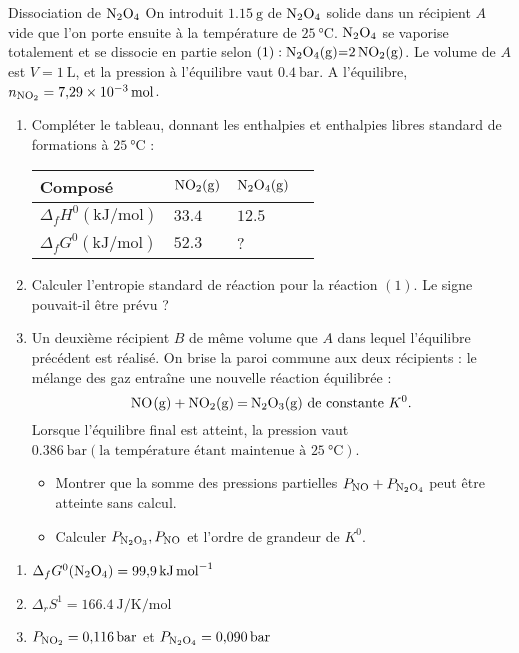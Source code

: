 \documentclass[french, a4paper, 11pt]{article}
\begin{document}
\begin{cadre}{Dissociation de \(\ce{N2O4}\)}
  On introduit \(\SI{1.15}{\gram}\) de \(\ce{N2O4}\) solide dans un récipient \(A\) vide que l'on porte ensuite à
  la température de \(\SI{25}{\celsius}\). \(\ce{N2O4}\) se vaporise totalement et se dissocie en partie selon \(\left(1\right) : \ce{N2O4(g)=2NO2(g)}\).
  Le volume de \(A\) est \(V=\SI{1}{\liter}\), et la pression à l'équilibre vaut \(\SI{0.4}{\bar}\). A l'équilibre, \(n_{\ce{NO2}}=\SI{7.29e-3}{\mole}\).
  \begin{enumerate}
    \item Compléter le tableau, donnant les enthalpies et enthalpies libres standard de formations à \(\SI{25}{\celsius}\) :
      \begin{tabular}{|l|l|l|l}
        \hline Composé & \(\ce{NO2(g)}\) & \(\ce{N2O4(g)}\) \\
        \hline \(\Delta_fH^0(\si{\kilo\joule\per\mole})\) & \(33.4\) & \(12.5\) \\
        \hline \(\Delta_fG^0(\si{\kilo\joule\per\mole})\) & \(52.3\) & ? \\
        \hline
      \end{tabular}
    \item Calculer l'entropie standard de réaction pour la réaction \(\left(1\right)\). Le signe pouvait-il être prévu ?
    \item Un deuxième récipient \(B\) de même volume que \(A\) dans lequel l'équilibre précédent est réalisé. On brise la paroi 
    commune aux deux récipients : le mélange des gaz entraîne une nouvelle réaction équilibrée :
      \[\ce{NO(g) + NO2(g) = N2O3(g)} \text{ de constante } K^0.\]
    Lorsque l'équilibre final est atteint, la pression vaut \(\SI{0.386}{\bar} \left( \text{la température étant maintenue à } \SI{25}{\celsius}\right)\).
      \begin{itemize}
        \item Montrer que la somme des pressions partielles \(P_{\ce{NO}}+P_{\ce{N2O4}}\) peut être atteinte sans calcul.
        \item Calculer \(P_{\ce{N2O3}},P_{\ce{NO}}\) et l'ordre de grandeur de \(K^0\).
      \end{itemize}
  \end{enumerate}

  \tcblower
  \begin{enumerate}
    \item \(\Delta_fG^0(\ce{N2O4})=\SI{99.9}{\kilo\joule\per\mole}\)
    \item \(\Delta_rS^1=\SI{166.4}{\joule\per\kelvin\per\mole}\)
    \item \(P_{\ce{NO2}}=\SI{0.116}{\bar}\) et \(P_{\ce{N2O4}}=\SI{0.090}{\bar}\)
  \end{enumerate}
\end{cadre}
\end{document}
